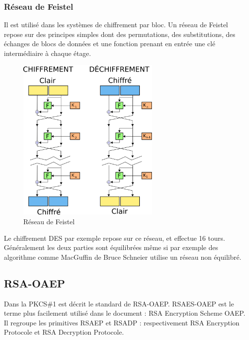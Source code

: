 \subsubsection*{Réseau de Feistel}
Il est utilisé dans les systèmes de chiffrement par bloc. Un réseau de Feistel repose sur des principes simples dont des permutations, des substitutions, des échanges de blocs de données et une fonction prenant en entrée une clé intermédiaire à chaque étage.\\
\begin{figure}[H]
	\centering
	\includegraphics[width=7cm]{images/Reseau_de_feistel.png}
	\caption{Réseau de Feistel}
	\label{Feistel}
\end{figure}

Le chiffrement DES par exemple repose sur ce réseau, et effectue 16 tours.\\
Généralement les deux parties sont équilibrées même si par exemple des algorithme comme MacGuffin de Bruce Schneier utilise un réseau non équilibré.

\subsection{RSA-OAEP}
Dans la PKCS\#1 est décrit le standard de RSA-OAEP. RSAES-OAEP est le terme plus facilement utilisé dans le document : RSA Encryption Scheme OAEP.\\
Il regroupe les primitives RSAEP et RSADP : respectivement RSA Encryption Protocole et RSA Decryption Protocole.

